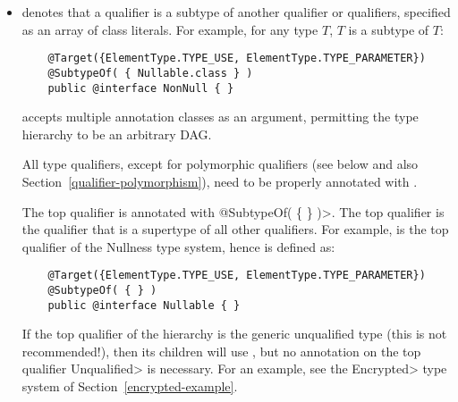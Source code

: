 \begin{itemize}

\item {} denotes that a qualifier is a subtype of
  another qualifier or qualifiers, specified as an array of class
  literals.  For example, for any type $T$,
   $T$ is a subtype of  $T$:

  \begin{Verbatim}
    @Target({ElementType.TYPE_USE, ElementType.TYPE_PARAMETER})
    @SubtypeOf( { Nullable.class } )
    public @interface NonNull { }
  \end{Verbatim}



   accepts multiple annotation classes as an argument,
  permitting the type hierarchy to be an arbitrary DAG\@.


  All type qualifiers, except for polymorphic qualifiers (see below and
  also Section~\ref{qualifier-polymorphism}), need to be
  properly annotated with .

  The top qualifier is annotated with
  \<@SubtypeOf( \{ \} )>.  The top qualifier is the qualifier that is
  a supertype of all other qualifiers.  For example, 
  is the top qualifier of the Nullness type system, hence is defined as:

  \begin{Verbatim}
    @Target({ElementType.TYPE_USE, ElementType.TYPE_PARAMETER})
    @SubtypeOf( { } )
    public @interface Nullable { }
  \end{Verbatim}

  \begin{sloppypar}
  If the top qualifier of the hierarchy is the generic unqualified type
  (this is not recommended!), then its children
  will use , but no
   annotation on the top qualifier \<Unqualified> is
  necessary.  For an example, see the
  \<Encrypted> type system of Section~\ref{encrypted-example}.
  \end{sloppypar}


\end{itemize}
